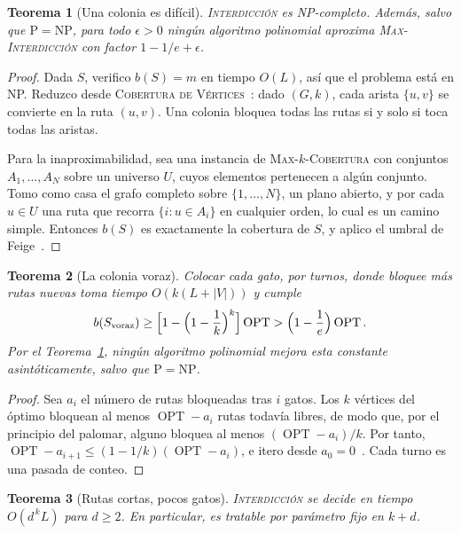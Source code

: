 \documentclass[11pt,a4paper]{article}
\theoremstyle{plain}
\newtheorem{teorema}{Teorema}[section]
\theoremstyle{definition}
\theoremstyle{remark}
\numberwithin{equation}{section}
\newcommand{\OPT}{\operatorname{OPT}}
\newcommand{\prob}[1]{\textnormal{\textsc{#1}}}
\begin{document}
\begin{teorema}[Una colonia es difícil]\label{teo:npc}
\prob{Interdicción} es NP-completo. Además, salvo que $\mathrm{P}=\mathrm{NP}$, para todo $\epsilon>0$ ningún algoritmo polinomial aproxima \prob{Max-Interdicción} con factor $1-1/e+\epsilon$.
\end{teorema}

\begin{proof}
Dada $S$, verifico $b(S)=m$ en tiempo $O(L)$, así que el problema está en NP. Reduzco desde \prob{Cobertura de Vértices}~\cite{karp}: dado $(G,k)$, cada arista $\{u,v\}$ se convierte en la ruta $(u,v)$. Una colonia bloquea todas las rutas si y solo si toca todas las aristas.

Para la inaproximabilidad, sea una instancia de \prob{Max-$k$-Cobertura} con conjuntos $A_1,\dots,A_N$ sobre un universo $U$, cuyos elementos pertenecen a algún conjunto. Tomo como casa el grafo completo sobre $\{1,\dots,N\}$, un plano abierto, y por cada $u\in U$ una ruta que recorra $\{i:u\in A_i\}$ en cualquier orden, lo cual es un camino simple. Entonces $b(S)$ es exactamente la cobertura de $S$, y aplico el umbral de Feige~\cite{feige}.
\end{proof}

\begin{teorema}[La colonia voraz]\label{teo:voraz}
Colocar cada gato, por turnos, donde bloquee más rutas nuevas toma tiempo $O(k(L+|V|))$ y cumple
\begin{equation}
  b(S_{\mathrm{voraz}})\ge\Bigl[1-\Bigl(1-\frac1k\Bigr)^{k}\Bigr]\OPT>\Bigl(1-\frac1e\Bigr)\OPT.
\end{equation}
Por el Teorema~\ref{teo:npc}, ningún algoritmo polinomial mejora esta constante asintóticamente, salvo que $\mathrm{P}=\mathrm{NP}$.
\end{teorema}

\begin{proof}
Sea $a_i$ el número de rutas bloqueadas tras $i$ gatos. Los $k$ vértices del óptimo bloquean al menos $\OPT-a_i$ rutas todavía libres, de modo que, por el principio del palomar, alguno bloquea al menos $(\OPT-a_i)/k$. Por tanto, $\OPT-a_{i+1}\le(1-1/k)(\OPT-a_i)$, e itero desde $a_0=0$~\cite{nemhauser}. Cada turno es una pasada de conteo.
\end{proof}

\begin{teorema}[Rutas cortas, pocos gatos]\label{teo:fpt}
\prob{Interdicción} se decide en tiempo $O(d^{\,k}L)$ para $d\ge 2$. En particular, es tratable por parámetro fijo en $k+d$.
\end{teorema}
\end{document}
